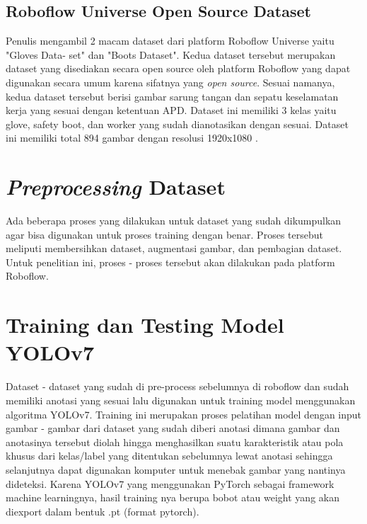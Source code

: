 \subsection{Roboflow Universe Open Source Dataset}
\label{roboflowdataset}

Penulis mengambil 2 macam dataset dari platform Roboflow Universe yaitu "Gloves Data- set" dan "Boots Dataset". Kedua dataset tersebut merupakan dataset yang disediakan secara open source oleh platform Roboflow yang dapat digunakan secara umum karena sifatnya yang \emph{open source}. Sesuai namanya, kedua dataset tersebut berisi gambar sarung tangan dan sepatu keselamatan kerja yang sesuai dengan ketentuan APD. Dataset ini memiliki 3 kelas yaitu glove, safety boot, dan worker yang sudah dianotasikan dengan sesuai. Dataset ini memiliki total 894 gambar dengan resolusi 1920x1080 \cite{gloves-7zhos_dataset} \cite{boots-uzihq_dataset}.

\section{\textit{Preprocessing} Dataset}
\label{sec:preprocessing}
\par Ada beberapa proses yang dilakukan untuk dataset yang sudah dikumpulkan agar bisa digunakan untuk proses training dengan benar. Proses tersebut meliputi membersihkan dataset, augmentasi gambar, dan pembagian dataset. Untuk penelitian ini, proses - proses tersebut akan dilakukan pada platform Roboflow.

\section{Training dan Testing Model YOLOv7}
\label{sec:trainingdataset}

\par Dataset - dataset yang sudah di pre-process sebelumnya di roboflow dan sudah memiliki anotasi yang sesuai lalu digunakan untuk training model menggunakan algoritma YOLOv7. Training ini merupakan proses pelatihan model dengan input gambar - gambar dari dataset yang sudah diberi anotasi dimana gambar dan anotasinya tersebut diolah hingga menghasilkan suatu karakteristik atau pola khusus dari kelas/label yang ditentukan sebelumnya lewat anotasi sehingga selanjutnya dapat digunakan komputer untuk menebak gambar yang nantinya dideteksi. Karena YOLOv7 yang menggunakan PyTorch sebagai framework machine learningnya, hasil training nya berupa bobot atau weight yang akan diexport dalam bentuk .pt (format pytorch).


